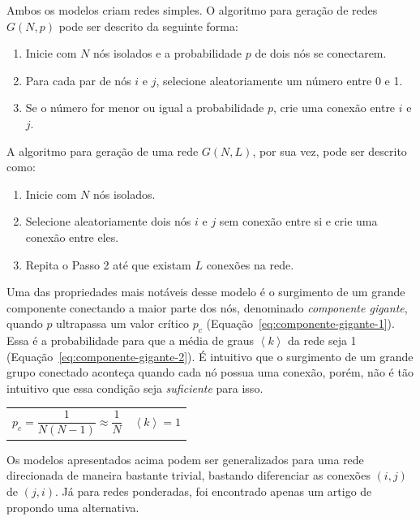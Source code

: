 \documentclass[12pt,a4paper]{article}
\theoremstyle{hypo}
\newcommand{\avg}[1]{\left\langle #1 \right\rangle} %
\begin{document}
Ambos os modelos criam redes simples. O algoritmo para geração de redes $G(N, p)$ pode ser descrito da seguinte forma:

\begin{enumerate}
\item Inicie com $N$ nós isolados e a probabilidade $p$ de dois nós se conectarem.

\item Para cada par de nós $i$ e $j$, selecione aleatoriamente um número entre 0 e 1.

\item Se o número for menor ou igual a probabilidade $p$, crie uma conexão entre $i$ e $j$.
\end{enumerate}

A algoritmo para geração de uma rede $G(N, L)$, por sua vez,  pode ser descrito como:

\begin{enumerate}
\item Inicie com $N$ nós isolados.
\item Selecione aleatoriamente dois nós $i$ e $j$ sem conexão entre si e crie uma conexão entre eles.
\item Repita o Passo 2 até que existam $L$ conexões na rede.
\end{enumerate}

Uma das propriedades mais notáveis desse modelo é o surgimento de um grande componente conectando a maior parte dos nós, denominado \textit{componente gigante}, quando $p$ ultrapassa um valor crítico $p_c$ (Equação~\ref{eq:componente-gigante-1}). Essa é a probabilidade para que a média de graus $\avg{k}$ da rede seja 1 (Equação~\ref{eq:componente-gigante-2}). É intuitivo que o surgimento de um grande grupo conectado aconteça quando cada nó possua uma conexão, porém, não é tão intuitivo que essa condição seja \textit{suficiente} para isso.

\noindent
\begin{tabularx}{\linewidth}{@{}XX@{}}
    \begin{equation} \label{eq:componente-gigante-1}
        p_c = \frac{1}{N(N - 1)} \approx \frac{1}{N}
    \end{equation} &
    \begin{equation} \label{eq:componente-gigante-2}
        \avg{k} = 1
    \end{equation}
\end{tabularx}

Os modelos apresentados acima podem ser generalizados para uma rede direcionada de maneira bastante trivial, bastando diferenciar as conexões $(i, j)$ de $(j, i)$. Já para redes ponderadas, foi encontrado apenas um artigo de  propondo uma alternativa.
\end{document}
